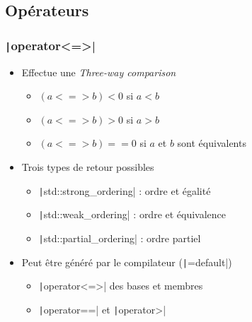 \documentclass[C++.tex]{subfiles}
\begin{document}
\subsection*{Opérateurs}
\begin{frame}[fragile]
	\frametitle{\texttt|operator<=>|}
	\begin{itemize}
		\item Effectue une \og \textit{Three-way comparison}\fg{}
		\begin{itemize}
			\item $(a <=> b) < 0$ si $a < b$
			\item $(a <=> b) > 0$ si $a > b$
			\item $(a <=> b) == 0$ si $a$ et $b$ sont équivalents


		\end{itemize}
		\item Trois types de retour possibles
		\begin{itemize}
			\item \texttt|std::strong_ordering| : ordre et égalité
			\item \texttt|std::weak_ordering| : ordre et équivalence
			\item \texttt|std::partial_ordering| : ordre partiel
		\end{itemize}


		\item Peut être généré par le compilateur (\texttt|=default|)
		\begin{itemize}
			\item \texttt|operator<=>| des bases et membres
			\item \texttt|operator==| et \texttt|operator>|
		\end{itemize}
	\end{itemize}
\end{frame}
\end{document}
